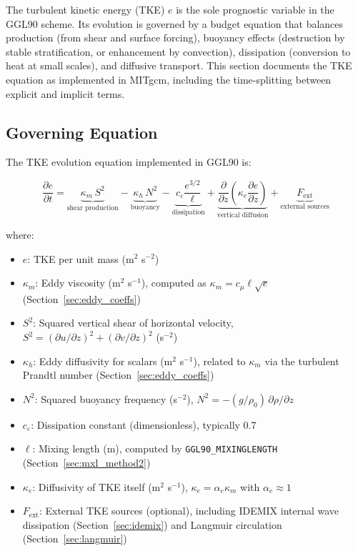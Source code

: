 \documentclass[12pt,letterpaper]{article}
\begin{document}
The turbulent kinetic energy (TKE) $e$ is the sole prognostic variable in the GGL90 scheme. Its evolution is governed by a budget equation that balances production (from shear and surface forcing), buoyancy effects (destruction by stable stratification, or enhancement by convection), dissipation (conversion to heat at small scales), and diffusive transport. This section documents the TKE equation as implemented in MITgcm, including the time-splitting between explicit and implicit terms.

\subsection{Governing Equation}
\label{sec:tke_governing}

The TKE evolution equation implemented in GGL90 is:

\begin{equation}
\frac{\partial e}{\partial t} = \underbrace{\kappa_m \, S^2}_{\text{shear production}}
- \underbrace{\kappa_h \, N^2}_{\text{buoyancy}}
- \underbrace{c_\varepsilon \frac{e^{3/2}}{\ell}}_{\text{dissipation}}
+ \underbrace{\frac{\partial}{\partial z} \left( \kappa_e \frac{\partial e}{\partial z} \right)}_{\text{vertical diffusion}}
+ \underbrace{F_{\text{ext}}}_{\text{external sources}}
\label{eq:tke_budget}
\end{equation}

where:
\begin{itemize}
\item $e$: TKE per unit mass (m$^2$ s$^{-2}$)
\item $\kappa_m$: Eddy viscosity (m$^2$ s$^{-1}$), computed as $\kappa_m = c_\mu \ell \sqrt{e}$ (Section~\ref{sec:eddy_coeffs})
\item $S^2$: Squared vertical shear of horizontal velocity, $S^2 = ({\partial u}/{\partial z})^2 + ({\partial v}/{\partial z})^2$ (s$^{-2}$)
\item $\kappa_h$: Eddy diffusivity for scalars (m$^2$ s$^{-1}$), related to $\kappa_m$ via the turbulent Prandtl number (Section~\ref{sec:eddy_coeffs})
\item $N^2$: Squared buoyancy frequency (s$^{-2}$), $N^2 = -(g/\rho_0) \, \partial\rho/\partial z$
\item $c_\varepsilon$: Dissipation constant (dimensionless), typically 0.7
\item $\ell$: Mixing length (m), computed by \verb|GGL90_MIXINGLENGTH| (Section~\ref{sec:mxl_method2})
\item $\kappa_e$: Diffusivity of TKE itself (m$^2$ s$^{-1}$), $\kappa_e = \alpha_e \kappa_m$ with $\alpha_e \approx 1$
\item $F_{\text{ext}}$: External TKE sources (optional), including IDEMIX internal wave dissipation (Section~\ref{sec:idemix}) and Langmuir circulation (Section~\ref{sec:langmuir})
\end{itemize}
\end{document}
